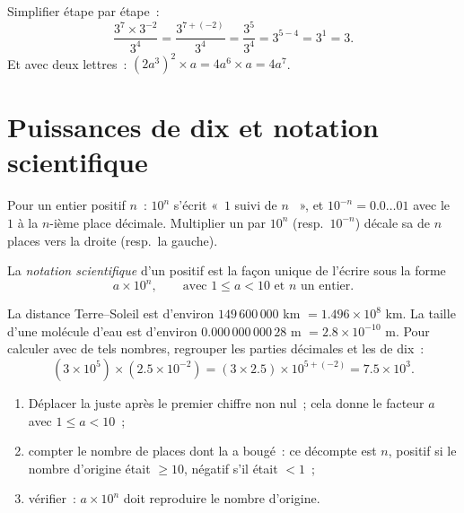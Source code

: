 \begin{example}\label{ex:g9:fractions:rules}
Simplifier étape par étape~:
\[
\frac{3^7 \times 3^{-2}}{3^4}
= \frac{3^{7 + (-2)}}{3^4}
= \frac{3^5}{3^4}
= 3^{5-4} = 3^1 = 3 .
\]
Et avec deux lettres~: $(2a^3)^2 \times a = 4 a^6 \times a = 4a^7$.
\end{example}

\section{Puissances de dix et notation scientifique}

\begin{proposition}\label{prop:g9:fractions:ten}
Pour un entier positif $n$~: $10^n$ s'écrit «~$1$ suivi de $n$ ~»,
et $10^{-n} = 0.0\dots01$ avec le $1$ à la $n$-ième place décimale.
Multiplier un  par $10^n$ (resp.\ $10^{-n}$) décale sa
 de $n$ places vers la droite (resp.\ la gauche).
\end{proposition}

\begin{definition}\label{def:g9:fractions:scientific}
La \emph{notation scientifique} d'un
 positif est la façon unique de l'écrire sous la forme
\[
a \times 10^n,
\qquad\text{avec } 1 \leq a < 10 \text{ et } n \text{ un entier.}
\]
\end{definition}

\begin{example}\label{ex:g9:fractions:scientific}
La distance Terre--Soleil est d'environ $149\,600\,000$ km $= 1.496
\times 10^8$ km. La taille d'une molécule d'eau est d'environ
$0.000\,000\,000\,28$ m $= 2.8 \times 10^{-10}$ m. Pour calculer avec de
tels nombres, regrouper les parties décimales et les  de
dix~:
\[
(3 \times 10^5) \times (2.5 \times 10^{-2})
= (3 \times 2.5) \times 10^{5 + (-2)}
= 7.5 \times 10^{3}.
\]
\end{example}

\begin{method}\label{met:g9:fractions:scientific}
\begin{enumerate}
  \item Déplacer la  juste après le premier chiffre non nul~;
        cela donne le facteur $a$ avec $1 \leq a < 10$~;
  \item compter le nombre de places dont la  a bougé~: ce
        décompte est $n$, positif si le nombre d'origine était
        $\geq 10$, négatif s'il était $< 1$~;
  \item vérifier~: $a \times 10^n$ doit reproduire le nombre d'origine.
\end{enumerate}
\end{method}

